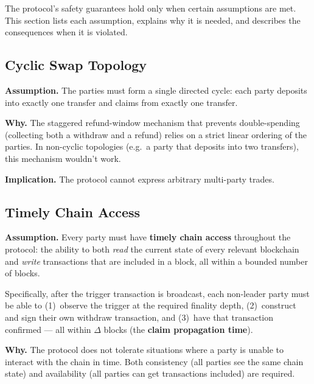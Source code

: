 \documentclass[11pt,a4paper]{article}
\begin{document}
The protocol's safety guarantees hold only when certain assumptions are met.
This section lists each assumption, explains why it is needed, and
describes the consequences when it is violated.

\subsection{Cyclic Swap Topology}

\textbf{Assumption.}\;
The parties must form a single directed cycle: each party deposits into
exactly one transfer and claims from exactly one transfer.

\textbf{Why.}\;
The staggered refund-window mechanism that prevents double-spending
(collecting both a withdraw and a refund) relies on a strict linear
ordering of the parties.
In non-cyclic topologies (e.g.\ a party that deposits into two transfers),
this mechanism wouldn't work.

\textbf{Implication.}\;
The protocol cannot express arbitrary multi-party trades.

\subsection{Timely Chain Access}

\textbf{Assumption.}\;
Every party must have \textbf{timely chain access} throughout the protocol:
the ability to both \emph{read} the current state of every relevant
blockchain and \emph{write} transactions that are included in a block,
all within a bounded number of blocks.

Specifically, after the trigger transaction is broadcast, each non-leader
party must be able to (1)~observe the trigger at the required finality
depth, (2)~construct and sign their own withdraw transaction, and
(3)~have that transaction confirmed --- all within $\Delta$ blocks (the
\textbf{claim propagation time}).

\textbf{Why.}\;
The protocol does not tolerate situations where a party is unable to
interact with the chain in time.
Both consistency (all parties see the same chain state) and availability
(all parties can get transactions included) are required.
\end{document}
